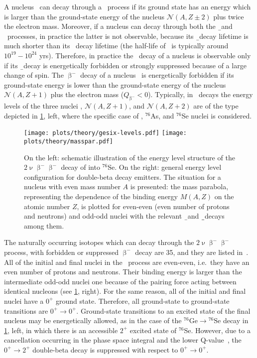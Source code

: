 A nucleus \NAZ\ can decay through a \nnbb\ process if its ground state has an
energy which is larger than the ground-state energy of the nucleus
$\mathcal{N}(A,Z\pm2)$ plus twice the electron mass. Moreover, if a nucleus can
decay through both the \b\ and \nnbb\ processes, in practice the latter is not
observable, because its \b\ decay lifetime is much shorter than its \nnbb\
decay lifetime (the half-life of \nnbb\ is typically around $10^{19}-10^{24}$
yrs). Therefore, in practice the \nnbb\ decay of a nucleus is observable only
if its \b\ decay is energetically forbidden or strongly suppressed because of a
large change of spin. The $\upbeta^-$ decay of a nucleus \NAZ\ is energetically
forbidden if its ground-state energy is lower than the ground-state energy of
the nucleus $\mathcal{N}(A,Z+1)$ plus the electron mass ($Q_{\upbeta^{-}} < 0$).
Typically, in \nnbbm\ decays the energy levels of the three nuclei \NAZ,
$\mathcal{N}(A,Z+1)$, and $\mathcal{N}(A,Z+2)$ are of the type depicted in
\cref{fig:nbb:gesixlevels}, left, where the specific case of \gesix,
$^{76}$As, and $^{76}$Se nuclei is considered.

\begin{figure}
  \centering
  \texttt{[image: plots/theory/gesix-levels.pdf]}%
  \texttt{[image: plots/theory/masspar.pdf]}%
  \caption{%
    On the left: schematic illustration of the energy level structure of the
    $2\upnu\upbeta^-\upbeta^-$ decay of \gesix into $^{76}$Se. On the right: general
    energy level configuration for double-beta decay emitters.  The situation
    for a nucleus with even mass number $A$ is presented: the mass parabola,
    representing the dependence of the binding energy $M(A,Z)$ on the atomic
    number $Z$, is plotted for even-even (even number of protons and neutrons)
    and odd-odd nuclei with the relevant \b\ and \b\b\ decays among them.
  }\label{fig:nbb:gesixlevels}
\end{figure}

\blocktitle{$2\upnu\upbeta^-\upbeta^-$}
The naturally occurring isotopes which can decay through the
$2\upnu\upbeta^-\upbeta^-$ process, with forbidden or suppressed $\upbeta^-$ decay are
35, and they are listed in~\cite{Giunti2007}. All of the initial and final
nuclei in the \nnbbm\ process are even-even, i.e.~they have an
even number of protons and neutrons. Their binding energy is larger than the
intermediate odd-odd nuclei one because of the pairing force acting between
identical nucleons (see \cref{fig:nbb:gesixlevels}, right). For the same reason,
all of the initial and final nuclei have a $0^+$ ground state.  Therefore, all
ground-state to ground-state transitions are $0^+\rightarrow0^+$. Ground-state
transitions to an excited state of the final nucleus may be energetically
allowed, as in the case of the $^{76}\text{Ge} \rightarrow {^{76}\text{Se}}$ decay in
\cref{fig:nbb:gesixlevels}, left, in which there is an accessible $2^+$ excited
state of $^{76}$Se. However, due to a cancellation occurring in the phase
space integral and the lower Q-value~\cite{Tomoda1991}, the
$0^+\rightarrow2^+$ double-beta decay is suppressed with respect to
$0^+\rightarrow0^+$.

